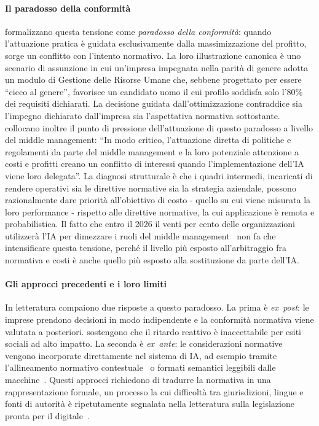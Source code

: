 \documentclass[pdflatex, sn-apa]{sn-jnl}%
\theoremstyle{thmstyleone}%
\theoremstyle{thmstyletwo}%
\theoremstyle{thmstylethree}%
\begin{document}
\paragraph{Il paradosso della conformità}
\citet{sargsyan2025legends} formalizzano questa tensione come \emph{paradosso
della conformità}: quando l'attuazione pratica è guidata esclusivamente dalla
massimizzazione del profitto, sorge un conflitto con l'intento normativo. La
loro illustrazione canonica è uno scenario di assunzione in cui un'impresa
impegnata nella parità di genere adotta un modulo di Gestione delle Risorse
Umane che, sebbene progettato per essere ``cieco al genere'', favorisce un
candidato uomo il cui profilo soddisfa solo l'80\% dei requisiti dichiarati. La
decisione guidata dall'ottimizzazione contraddice sia l'impegno dichiarato
dall'impresa sia l'aspettativa normativa sottostante.
\citet{sargsyan2025legends} collocano inoltre il punto di pressione
dell'attuazione di questo paradosso a livello del middle management: ``In modo
critico, l'attuazione diretta di politiche e regolamenti da parte del middle
management e la loro potenziale attenzione a costi e profitti creano un
conflitto di interessi quando l'implementazione dell'IA viene loro delegata''.
La diagnosi strutturale è che i quadri intermedi, incaricati di rendere operativi
sia le direttive normative sia la strategia aziendale, possono razionalmente
dare priorità all'obiettivo di costo - quello su cui viene misurata la loro
performance - rispetto alle direttive normative, la cui applicazione è remota e
probabilistica. Il fatto che entro il 2026 il venti per cento delle
organizzazioni utilizzerà l'IA per dimezzare i ruoli del middle
management~\citep{economist2024gartner} non fa che intensificare questa
tensione, perché il livello più esposto all'arbitraggio fra normativa e costi è
anche quello più esposto alla sostituzione da parte dell'IA.

\paragraph{Gli approcci precedenti e i loro limiti}
In letteratura compaiono due risposte a questo paradosso. La prima è
\emph{ex~post}: le imprese prendono decisioni in modo indipendente e la
conformità normativa viene valutata a posteriori. \citet{sargsyan2025legends}
sostengono che il ritardo reattivo è inaccettabile per esiti sociali ad alto
impatto. La seconda è \emph{ex~ante}: le considerazioni normative vengono
incorporate direttamente nel sistema di IA, ad esempio tramite l'allineamento
normativo contestuale~\citep{achintalwar2024alignment} o formati semantici
leggibili dalle macchine~\citep{mclaughlin2021x2rl}. Questi approcci richiedono
di tradurre la normativa in una rappresentazione formale, un processo la cui
difficoltà tra giurisdizioni, lingue e fonti di autorità è ripetutamente
segnalata nella letteratura sulla legislazione pronta per il
digitale~\citep{motzfeldt2018digital}.
 
\end{document}
